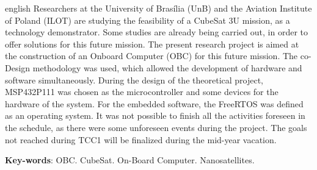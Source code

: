 \begin{resumo}[Abstract]
 \begin{otherlanguage*}{english}
Researchers at the University of Brasília (UnB) and the Aviation Institute of Poland (ILOT) are studying the feasibility of a CubeSat 3U mission, as a technology demonstrator. Some studies are already being carried out, in order to offer solutions for this future mission. The present research project is aimed at the construction of an Onboard Computer (OBC) for this future mission. The co-Design methodology was used, which allowed the development of hardware and software simultaneously. During the design of the theoretical project, MSP432P111 was chosen as the microcontroller and some devices for the hardware of the system. For the embedded software, the FreeRTOS was defined as an operating system. It was not possible to finish all the activities foreseen in the schedule, as there were some unforeseen events during the project. The goals not reached during TCC1 will be finalized during the mid-year vacation.

   \vspace{\onelineskip}
 
   \noindent 
   \textbf{Key-words}: OBC. CubeSat. On-Board Computer. Nanosatellites.
 \end{otherlanguage*}
\end{resumo}
